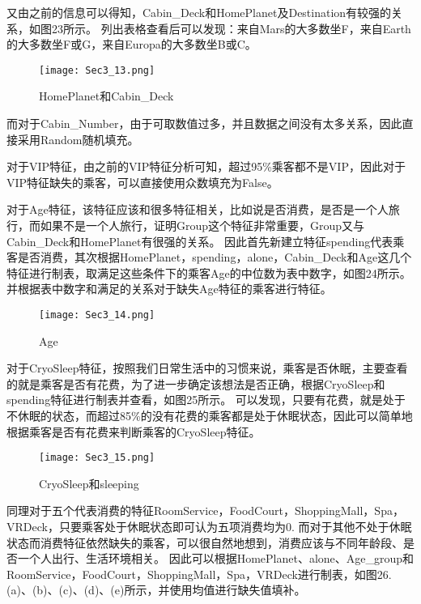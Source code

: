 \documentclass[../main.tex]{subfiles}
\begin{document}
            又由之前的信息可以得知，Cabin\_Deck和HomePlanet及Destination有较强的关系，如图23所示。
            列出表格查看后可以发现：来自Mars的大多数坐F，来自Earth的大多数坐F或G，来自Europa的大多数坐B或C。

            \begin{figure}[H]
                \centering
                \texttt{[image: Sec3\_13.png]}
                \caption{HomePlanet和Cabin\_Deck}
            \end{figure}

            而对于Cabin\_Number，由于可取数值过多，并且数据之间没有太多关系，因此直接采用Random随机填充。

            对于VIP特征，由之前的VIP特征分析可知，超过95\%乘客都不是VIP，因此对于VIP特征缺失的乘客，可以直接使用众数填充为False。

            对于Age特征，该特征应该和很多特征相关，比如说是否消费，是否是一个人旅行，而如果不是一个人旅行，证明Group这个特征非常重要，Group又与Cabin\_Deck和HomePlanet有很强的关系。
            因此首先新建立特征spending代表乘客是否消费，其次根据HomePlanet，spending，alone，Cabin\_Deck和Age这几个特征进行制表，取满足这些条件下的乘客Age的中位数为表中数字，如图24所示。
            并根据表中数字和满足的关系对于缺失Age特征的乘客进行特征。

            \begin{figure}[H]
                \centering
                \texttt{[image: Sec3\_14.png]}
                \caption{Age}
            \end{figure}

            对于CryoSleep特征，按照我们日常生活中的习惯来说，乘客是否休眠，主要查看的就是乘客是否有花费，为了进一步确定该想法是否正确，根据CryoSleep和spending特征进行制表并查看，如图25所示。
            可以发现，只要有花费，就是处于不休眠的状态，而超过85\%的没有花费的乘客都是处于休眠状态，因此可以简单地根据乘客是否有花费来判断乘客的CryoSleep特征。

            \begin{figure}[H]
                \centering
                \texttt{[image: Sec3\_15.png]}
                \caption{CryoSleep和sleeping}
            \end{figure}

            同理对于五个代表消费的特征RoomService，FoodCourt，ShoppingMall，Spa，VRDeck，只要乘客处于休眠状态即可认为五项消费均为0.
            而对于其他不处于休眠状态而消费特征依然缺失的乘客，可以很自然地想到，消费应该与不同年龄段、是否一个人出行、生活环境相关。
            因此可以根据HomePlanet、alone、Age\_group和RoomService，FoodCourt，ShoppingMall，Spa，VRDeck进行制表，如图26.(a)、(b)、(c)、(d)、(e)所示，并使用均值进行缺失值填补。
\end{document}
